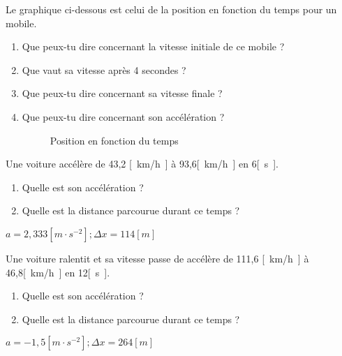\begin{exercise}
  Le graphique ci-dessous est celui de la position en fonction du temps pour un mobile.
  \begin{enumerate}[label=\alph*)]
    \item Que peux-tu dire concernant la vitesse initiale de ce mobile ?
    \item Que vaut sa vitesse après 4 secondes ?
    \item Que peux-tu dire concernant sa vitesse finale ?
    \item Que peux-tu dire concernant son accélération ?
          \begin{figure}[h!]
            \centering
            \caption{Position en fonction du temps}
            \label{Position en fonction du temps}
          \end{figure}
  \end{enumerate}
\end{exercise}

\begin{exercise}
\end{exercise}

\begin{exercise}
  Une voiture accélère de 43,2 \unit{[km/h]} à 93,6\unit{[km/h]} en 6\unit{[s]}.
  \begin{enumerate}[label=\alph*)]
    \item Quelle est son accélération ?
    \item Quelle est la distance parcourue durant ce temps ?
  \end{enumerate}
\end{exercise}
\begin{solution}
  \(a=2,333\unit{[m \cdot s^{-2}]} ; \Delta x=114[m] \)
\end{solution}


\begin{exercise}
  Une voiture ralentit et sa vitesse passe de accélère de 111,6 \unit{[km/h]} à 46,8\unit{[km/h]} en 12\unit{[s]}.
  \begin{enumerate}[label=\alph*)]
    \item Quelle est son accélération ?
    \item Quelle est la distance parcourue durant ce temps ?
  \end{enumerate}
\end{exercise}
\begin{solution}
  \(a=-1,5\unit{[m \cdot s^{-2}]} ; \Delta x=264[m]\)
\end{solution}

